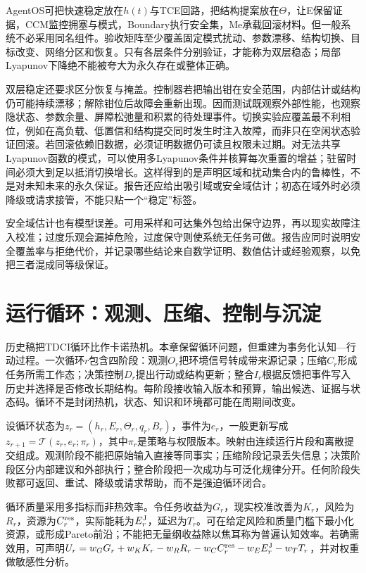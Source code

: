 AgentOS可把快速稳定放在$h(t)$与TCE回路，把结构提案放在$\Theta$，让E保留证据，CCM监控拥塞与模式，Boundary执行安全集，Me承载回滚材料。但一般系统不必采用同名组件。验收矩阵至少覆盖固定模式扰动、参数漂移、结构切换、目标改变、网络分区和恢复。只有各层条件分别验证，才能称为双层稳态；局部Lyapunov下降绝不能被夸大为永久存在或整体正确。

双层稳定还要求区分恢复与掩盖。控制器若把输出钳在安全范围，内部估计或结构仍可能持续漂移；解除钳位后故障会重新出现。因而测试既观察外部性能，也观察隐状态、参数余量、屏障松弛量和积累的待处理事件。切换实验应覆盖最不利相位，例如在高负载、低置信和结构提交同时发生时注入故障，而非只在空闲状态验证回滚。若回滚依赖旧数据，必须证明数据仍可读且权限未过期。对无法共享Lyapunov函数的模式，可以使用多Lyapunov条件并核算每次重置的增益；驻留时间必须大到足以抵消切换增长。这样得到的是声明区域和扰动集合内的鲁棒性，不是对未知未来的永久保证。报告还应给出吸引域或安全域估计；初态在域外时必须降级或请求接管，不能只贴一个“稳定”标签。

安全域估计也有模型误差。可用采样和可达集外包给出保守边界，再以现实故障注入校准；过度乐观会漏掉危险，过度保守则使系统无任务可做。报告应同时说明安全覆盖率与拒绝代价，并记录哪些结论来自数学证明、数值估计或经验观察，以免把三者混成同等级保证。

\section{运行循环：观测、压缩、控制与沉淀}
\label{sec:section_4255}

历史稿把TDCI循环比作卡诺热机。本章保留循环问题，但重建为事务化认知—行动过程。一次循环$r$包含四阶段：观测$O_r$把环境信号转成带来源记录；压缩$C_r$形成任务所需工作态；决策控制$D_r$提出行动或结构更新；整合$I_r$根据反馈把事件写入历史并选择是否修改长期结构。每阶段接收输入版本和预算，输出候选、证据与状态码。循环不是封闭热机，状态、知识和环境都可能在周期间改变。

设循环状态为$z_r=(h_r,E_r,\Theta_r,q_r,B_r)$，事件为$e_r$，一般更新写成$z_{r+1}=\mathcal T(z_r,e_r;\pi_r)$，其中$\pi_r$是策略与权限版本。映射由连续运行片段和离散提交组成。观测阶段不能把原始输入直接等同事实；压缩阶段记录丢失信息；决策阶段区分内部建议和外部执行；整合阶段把一次成功与可泛化规律分开。任何阶段失败都可返回、重试、降级或请求帮助，而不是强迫循环闭合。

循环质量采用多指标而非热效率。令任务收益为$G_r$，现实校准改善为$K_r$，风险为$R_r$，资源为$C_r^{\rm res}$，实际能耗为$E_r^{\rm J}$，延迟为$T_r$。可在给定风险和质量门槛下最小化资源，或形成Pareto前沿；不能把无量纲收益除以焦耳称为普遍认知效率。若确需效用，可声明$U_r=w_GG_r+w_KK_r-w_RR_r-w_CC_r^{\rm res}-w_EE_r^{\rm J}-w_TT_r$，并对权重做敏感性分析。

